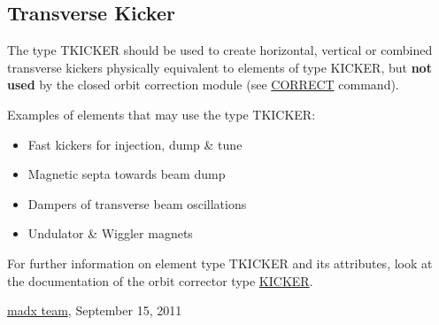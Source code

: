 



\subsection{Transverse Kicker}

 The type TKICKER should be used to create horizontal, vertical or combined transverse kickers physically equivalent to elements of type KICKER, but \textbf{not used} by the closed orbit correction module (see \href{../cororbit/co_correct.html}{CORRECT} command).  

Examples of elements that may use the type TKICKER: 
\begin{itemize}
	\item Fast kickers for injection, dump \& tune
	\item Magnetic septa towards beam dump
	\item Dampers of transverse beam oscillations
	\item Undulator \& Wiggler magnets
\end{itemize}

 For further information on element type TKICKER and its attributes, look at the documentation of the orbit corrector type \href{kickers.html#kick}{KICKER}.  

\href{mailto:mad@cern.ch}{madx team}, September 15, 2011  

